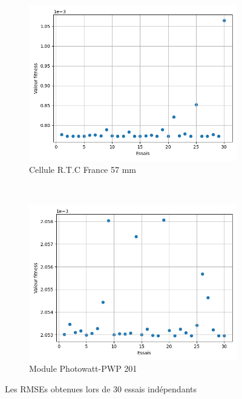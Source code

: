 \begin{figure}
    \centering
    \begin{subfigure}[b]{0.45\textwidth}
        \includegraphics[width=\textwidth]{resources/RTCFrance/singled/consist.png}
        \caption{Cellule R.T.C France 57 mm}
    \end{subfigure}
    ~
    \begin{subfigure}[b]{0.45\textwidth}
        \includegraphics[width=\textwidth]{resources/pwp/consistency.png}
        \caption{Module Photowatt-PWP 201}
    \end{subfigure}
    \caption{Les RMSEs obtenues lors de 30 essais indépendants}
    \label{fig:consist}
\end{figure}

